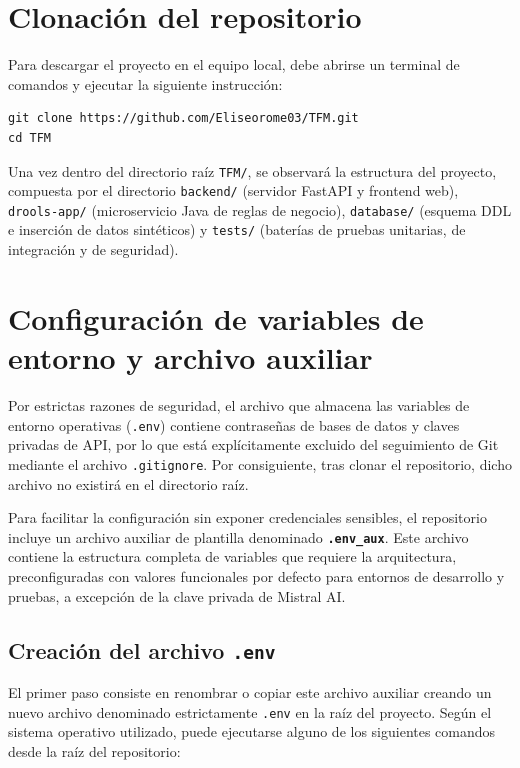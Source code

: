 \section{Clonación del repositorio}

Para descargar el proyecto en el equipo local, debe abrirse un terminal de comandos y ejecutar la siguiente instrucción:

\begin{verbatim}
git clone https://github.com/Eliseorome03/TFM.git
cd TFM
\end{verbatim}

Una vez dentro del directorio raíz \texttt{TFM/}, se observará la estructura del proyecto, compuesta por el directorio \texttt{backend/} (servidor FastAPI y frontend web), \texttt{drools-app/} (microservicio Java de reglas de negocio), \texttt{database/} (esquema DDL e inserción de datos sintéticos) y \texttt{tests/} (baterías de pruebas unitarias, de integración y de seguridad).

\section{Configuración de variables de entorno y archivo auxiliar}

Por estrictas razones de seguridad, el archivo que almacena las variables de entorno operativas (\texttt{.env}) contiene contraseñas de bases de datos y claves privadas de API, por lo que está explícitamente excluido del seguimiento de Git mediante el archivo \texttt{.gitignore}. Por consiguiente, tras clonar el repositorio, dicho archivo no existirá en el directorio raíz.

Para facilitar la configuración sin exponer credenciales sensibles, el repositorio incluye un archivo auxiliar de plantilla denominado \textbf{\texttt{.env\_aux}}. Este archivo contiene la estructura completa de variables que requiere la arquitectura, preconfiguradas con valores funcionales por defecto para entornos de desarrollo y pruebas, a excepción de la clave privada de Mistral AI.

\subsection{Creación del archivo \texttt{.env}}

El primer paso consiste en renombrar o copiar este archivo auxiliar creando un nuevo archivo denominado estrictamente \texttt{.env} en la raíz del proyecto. Según el sistema operativo utilizado, puede ejecutarse alguno de los siguientes comandos desde la raíz del repositorio:

